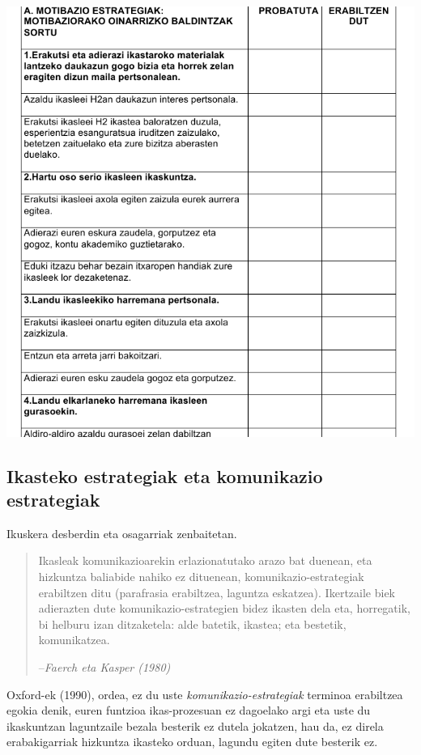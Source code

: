 \documentclass[]{book}
\begin{document}
\includegraphics{assets/06-02.png}

\hypertarget{ikasteko-estrategiak-eta-komunikazio-estrategiak}{%
\subsection{Ikasteko estrategiak eta komunikazio estrategiak}\label{ikasteko-estrategiak-eta-komunikazio-estrategiak}}

Ikuskera desberdin eta osagarriak zenbaitetan.

\begin{quote}
Ikasleak komunikazioarekin erlazionatutako arazo bat duenean, eta hizkuntza baliabide nahiko ez dituenean, komunikazio-estrategiak erabiltzen ditu (parafrasia erabiltzea, laguntza eskatzea). Ikertzaile biek adierazten dute komunikazio-estrategien bidez ikasten dela eta, horregatik, bi helburu izan ditzaketela: alde batetik, ikastea; eta bestetik, komunikatzea.

--\emph{Faerch eta Kasper (1980)}
\end{quote}

Oxford-ek (1990), ordea, ez du uste \emph{komunikazio-estrategiak} terminoa erabiltzea egokia denik, euren funtzioa ikas-prozesuan ez dagoelako argi eta uste du ikaskuntzan laguntzaile bezala besterik ez dutela jokatzen, hau da, ez direla erabakigarriak hizkuntza ikasteko orduan, lagundu egiten dute besterik ez.
\end{document}
